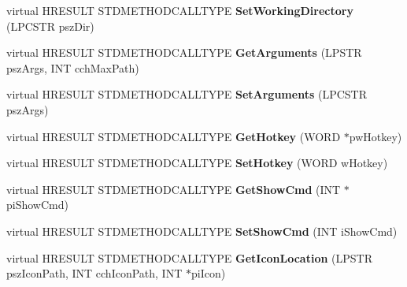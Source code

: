 \begin{DoxyCompactItemize}
\item 
\mbox{\label{class_c_shell_link_acef5ea5f2ba24c24e3c5e8854da76964}} 
virtual H\+R\+E\+S\+U\+LT S\+T\+D\+M\+E\+T\+H\+O\+D\+C\+A\+L\+L\+T\+Y\+PE {\bfseries Set\+Working\+Directory} (L\+P\+C\+S\+TR psz\+Dir)
\item 
\mbox{\label{class_c_shell_link_a4b7d9a6c7f569dba1f5831b91e2de0a0}} 
virtual H\+R\+E\+S\+U\+LT S\+T\+D\+M\+E\+T\+H\+O\+D\+C\+A\+L\+L\+T\+Y\+PE {\bfseries Get\+Arguments} (L\+P\+S\+TR psz\+Args, I\+NT cch\+Max\+Path)
\item 
\mbox{\label{class_c_shell_link_a4236c699da82ce0b65d1ce0576fc534d}} 
virtual H\+R\+E\+S\+U\+LT S\+T\+D\+M\+E\+T\+H\+O\+D\+C\+A\+L\+L\+T\+Y\+PE {\bfseries Set\+Arguments} (L\+P\+C\+S\+TR psz\+Args)
\item 
\mbox{\label{class_c_shell_link_a630b5383727687c469704fe7cba6c821}} 
virtual H\+R\+E\+S\+U\+LT S\+T\+D\+M\+E\+T\+H\+O\+D\+C\+A\+L\+L\+T\+Y\+PE {\bfseries Get\+Hotkey} (W\+O\+RD $\ast$pw\+Hotkey)
\item 
\mbox{\label{class_c_shell_link_ae3c9ac0ef9c4bda84bf3fe83d6d91b40}} 
virtual H\+R\+E\+S\+U\+LT S\+T\+D\+M\+E\+T\+H\+O\+D\+C\+A\+L\+L\+T\+Y\+PE {\bfseries Set\+Hotkey} (W\+O\+RD w\+Hotkey)
\item 
\mbox{\label{class_c_shell_link_a277e9b76279b9d6b8d5b8e23a3083a9d}} 
virtual H\+R\+E\+S\+U\+LT S\+T\+D\+M\+E\+T\+H\+O\+D\+C\+A\+L\+L\+T\+Y\+PE {\bfseries Get\+Show\+Cmd} (I\+NT $\ast$pi\+Show\+Cmd)
\item 
\mbox{\label{class_c_shell_link_add31ec4c52cb8bb33a406bae87a76e8a}} 
virtual H\+R\+E\+S\+U\+LT S\+T\+D\+M\+E\+T\+H\+O\+D\+C\+A\+L\+L\+T\+Y\+PE {\bfseries Set\+Show\+Cmd} (I\+NT i\+Show\+Cmd)
\item 
\mbox{\label{class_c_shell_link_aa5c0523ac50e0a465873c916b9123f85}} 
virtual H\+R\+E\+S\+U\+LT S\+T\+D\+M\+E\+T\+H\+O\+D\+C\+A\+L\+L\+T\+Y\+PE {\bfseries Get\+Icon\+Location} (L\+P\+S\+TR psz\+Icon\+Path, I\+NT cch\+Icon\+Path, I\+NT $\ast$pi\+Icon)
\item 
\mbox{\label{class_c_shell_link_a044e4b624a47127cf3c1ff7fb26c3fa9}} 

\end{DoxyCompactItemize}
